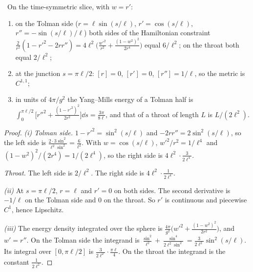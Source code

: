 \begin{proposition}\label{prop:sliceenergy}\ver\
On the time-symmetric slice, with $w=r'$:
\begin{enumerate}[label=(\roman*)]
\item on the Tolman side ($r=\ell\sin(s/\ell)$, $r'=\cos(s/\ell)$, $r''=-\sin(s/\ell)/\ell$) both sides of the Hamiltonian constraint $\frac2{r^2}(1-r'^2-2rr'')=4\ell^2\bigl(\frac{w'^2}{r^2}+\frac{(1-w^2)^2}{2r^4}\bigr)$ equal $6/\ell^2$; on the throat both equal $2/\ell^2$;
\item at the junction $s=\pi\ell/2$: $[r]=0$, $[r']=0$, $[r'']=1/\ell$, so the metric is $C^{1,1}$;
\item in units of $4\pi/g^2$ the Yang--Mills energy of a Tolman half is $\int_0^{\pi\ell/2}\bigl[r''^2+\frac{(1-r'^2)^2}{2r^2}\bigr]\dd s=\frac{3\pi}{8\ell}$, and that of a throat of length $L$ is $L/(2\ell^2)$.
\end{enumerate}
\end{proposition}
\begin{proof}
\emph{(i)} \emph{Tolman side.} $1-r'^2=\sin^2(s/\ell)$ and $-2rr''=2\sin^2(s/\ell)$, so the left side is $\frac{2\cdot3\sin^2}{\ell^2\sin^2}=\frac6{\ell^2}$. With $w=\cos(s/\ell)$, $w'^2/r^2=1/\ell^4$ and $(1-w^2)^2/(2r^4)=1/(2\ell^4)$, so the right side is $4\ell^2\cdot\frac3{2\ell^4}$.

\emph{Throat.} The left side is $2/\ell^2$. The right side is $4\ell^2\cdot\frac1{2\ell^4}$.

\emph{(ii)} At $s=\pi\ell/2$, $r=\ell$ and $r'=0$ on both sides. The second derivative is $-1/\ell$ on the Tolman side and $0$ on the throat. So $r'$ is continuous and piecewise $C^1$, hence Lipschitz.

\emph{(iii)} The energy density integrated over the sphere is $\frac{4\pi}{g^2}\bigl(w'^2+\frac{(1-w^2)^2}{2r^2}\bigr)$, and $w'=r''$. On the Tolman side the integrand is $\frac{\sin^2}{\ell^2}+\frac{\sin^4}{2\ell^2\sin^2}=\frac3{2\ell^2}\sin^2(s/\ell)$. Its integral over $[0,\pi\ell/2]$ is $\frac3{2\ell^2}\cdot\frac{\pi\ell}4$. On the throat the integrand is the constant $\frac1{2\ell^2}$.
\end{proof}


